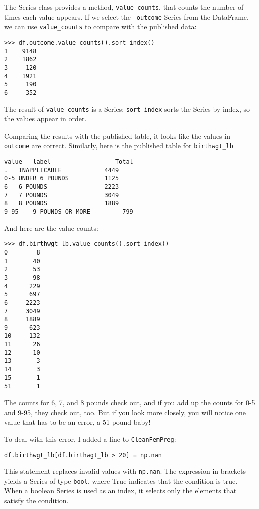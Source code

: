 The Series class provides a method, \verb"value_counts", that
counts the number of times each value appears.  If we select the {\tt
  outcome} Series from the DataFrame, we can use \verb"value_counts"
to compare with the published data:

\begin{verbatim}
>>> df.outcome.value_counts().sort_index()
1    9148
2    1862
3     120
4    1921
5     190
6     352
\end{verbatim}

The result of \verb"value_counts" is a Series;
\verb"sort_index" sorts the Series by index, so the
values appear in order.

Comparing the results with the published table, it looks like the
values in {\tt outcome} are correct.  Similarly, here is the published
table for \verb"birthwgt_lb"

\begin{verbatim}
value	label                  Total
.	INAPPLICABLE            4449
0-5	UNDER 6 POUNDS          1125
6	6 POUNDS                2223
7	7 POUNDS                3049
8	8 POUNDS                1889
9-95	9 POUNDS OR MORE         799
\end{verbatim}

And here are the value counts:

\begin{verbatim}
>>> df.birthwgt_lb.value_counts().sort_index()
0        8
1       40
2       53
3       98
4      229
5      697
6     2223
7     3049
8     1889
9      623
10     132
11      26
12      10
13       3
14       3
15       1
51       1
\end{verbatim}

The counts for 6, 7, and 8 pounds check out, and if you add
up the counts for 0-5 and 9-95, they check out, too.  But
if you look more closely, you will notice one value that has to be
an error, a 51 pound baby!

To deal with this error, I added a line to {\tt CleanFemPreg}:

\begin{verbatim}
df.birthwgt_lb[df.birthwgt_lb > 20] = np.nan
\end{verbatim}

This statement replaces invalid values with {\tt np.nan}.
The expression in brackets yields a Series of type {\tt bool}, 
where True indicates that the condition is true.  When a boolean
Series is used as an index, it selects only the elements that
satisfy the condition.


